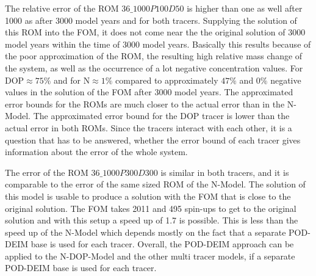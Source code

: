 The relative error of the ROM $36\_1000P100D50$ is higher than one as well after 1000 as after 3000 model years and for both tracers.
Supplying the solution of this ROM into the FOM, it does not come near the the original solution of 3000 model years within the
time of 3000 model years. Basically this results because of the poor approximation of the ROM, the resulting high relative mass change of the system, as well as the occurrence of
a lot negative concentration values. For DOP$\approx 75 \%$ and for N$\approx 1\%$ compared to approximately  $47\%$ and $0\%$ negative values in the solution of the
FOM after 3000 model years. The approximated error bounds for the ROMs are much closer to the actual error than in the N-Model.
The approximated error bound for the DOP tracer is lower than the actual error in both ROMs.
Since the tracers interact with each other, it is a question that has to be answered, whether the error bound of each tracer gives information about the error of the whole system.

The error of the ROM $36\_1000P300D300$ is similar in both tracers, and it is comparable to the error of the 
same sized ROM of the N-Model. The solution of this model is usable to produce a solution with the FOM that is close to the original solution. 
The FOM takes 2011 and 495 spin-ups to get to the original solution and with this setup a speed up of 1.7 is possible. This is less than the speed up of the
N-Model which depends mostly on the fact that a separate POD-DEIM base is used for each tracer.  
Overall, the POD-DEIM approach can be applied to the N-DOP-Model and the other multi tracer models, if a separate POD-DEIM base is used for each tracer.


